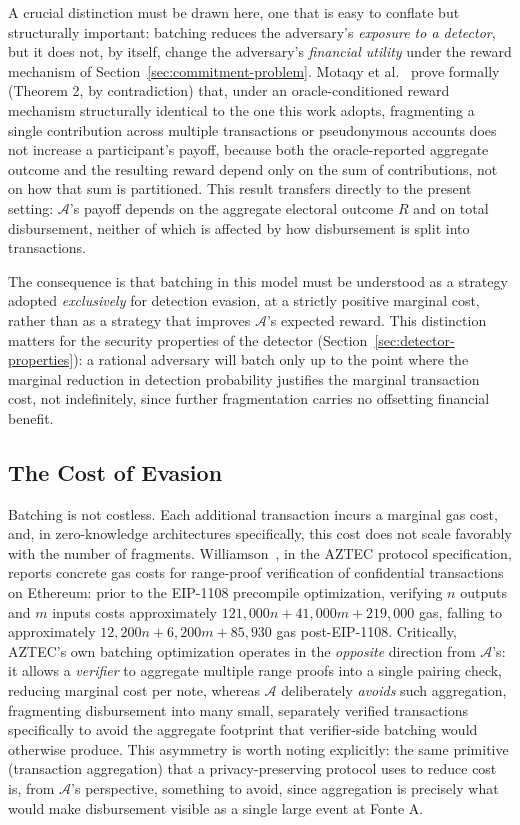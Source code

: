 \documentclass[journal,onecolumn,11pt]{IEEEtran}
\begin{document}
A crucial distinction must be drawn here, one that is easy to conflate but
structurally important: batching reduces the adversary's \emph{exposure to a
detector}, but it does not, by itself, change the adversary's \emph{financial
utility} under the reward mechanism of Section~\ref{sec:commitment-problem}.
Motaqy et al.~\cite{motaqy2021bet} prove formally (Theorem 2, by
contradiction) that, under an oracle-conditioned reward mechanism structurally
identical to the one this work adopts, fragmenting a single contribution
across multiple transactions or pseudonymous accounts does not increase a
participant's payoff, because both the oracle-reported aggregate outcome and
the resulting reward depend only on the sum of contributions, not on how that
sum is partitioned. This result transfers directly to the present setting:
$\mathcal{A}$'s payoff depends on the aggregate electoral outcome $R$ and on
total disbursement, neither of which is affected by how disbursement is
split into transactions.

The consequence is that batching in this model must be understood as a
strategy adopted \emph{exclusively} for detection evasion, at a strictly
positive marginal cost, rather than as a strategy that improves
$\mathcal{A}$'s expected reward. This distinction matters for the security
properties of the detector (Section~\ref{sec:detector-properties}): a rational
adversary will batch only up to the point where the marginal reduction in
detection probability justifies the marginal transaction cost, not
indefinitely, since further fragmentation carries no offsetting financial
benefit.

\subsection{The Cost of Evasion}
\label{subsec:evasion-cost}

Batching is not costless. Each additional transaction incurs a marginal gas
cost, and, in zero-knowledge architectures specifically, this cost does not
scale favorably with the number of fragments. Williamson~\cite{aztec2018protocol},
in the AZTEC protocol specification, reports concrete gas costs for
range-proof verification of confidential transactions on Ethereum: prior to
the EIP-1108 precompile optimization, verifying $n$ outputs and $m$ inputs
costs approximately $121{,}000n + 41{,}000m + 219{,}000$ gas, falling to
approximately $12{,}200n + 6{,}200m + 85{,}930$ gas post-EIP-1108. Critically,
AZTEC's own batching optimization operates in the \emph{opposite} direction
from $\mathcal{A}$'s: it allows a \emph{verifier} to aggregate multiple range
proofs into a single pairing check, reducing marginal cost per note, whereas
$\mathcal{A}$ deliberately \emph{avoids} such aggregation, fragmenting
disbursement into many small, separately verified transactions specifically
to avoid the aggregate footprint that verifier-side batching would otherwise
produce. This asymmetry is worth noting explicitly: the same primitive
(transaction aggregation) that a privacy-preserving protocol uses to reduce
cost is, from $\mathcal{A}$'s perspective, something to avoid, since
aggregation is precisely what would make disbursement visible as a single
large event at Fonte A.
\end{document}
